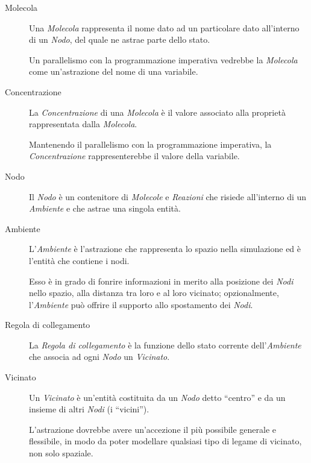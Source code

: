             \begin{description}
                \item[Molecola]\label{itm:mol}
                    Una \emph{Molecola} rappresenta il nome dato ad un particolare dato all'interno di un \emph{Nodo}, del quale ne astrae parte dello stato.

                    Un parallelismo con la programmazione imperativa vedrebbe la \emph{Molecola} come un'astrazione del nome di una variabile.

                \item[Concentrazione]\label{itm:conc}
                    La \emph{Concentrazione} di una \emph{Molecola} è il valore associato alla proprietà rappresentata dalla \emph{Molecola}.

                    Mantenendo il parallelismo con la programmazione imperativa, la \emph{Concentrazione} rappresenterebbe il valore della variabile.

                \item[Nodo]\label{itm:node}
                    Il \emph{Nodo} è un contenitore di \emph{Molecole} e \emph{Reazioni} che risiede all'interno di un \emph{Ambiente} e che astrae una singola entità.

                \item[Ambiente]\label{itm:env}
                    L'\emph{Ambiente} è l'astrazione che rappresenta lo spazio nella simulazione ed è l'entità che contiene i nodi.

                    Esso è in grado di fonrire informazioni in merito alla posizione dei \emph{Nodi} nello spazio, alla distanza tra loro e al loro vicinato; opzionalmente, l'\emph{Ambiente} può offrire il supporto allo spostamento dei \emph{Nodi}.

                \item[Regola di collegamento]\label{itm:linkr}
                    La \emph{Regola di collegamento} è la funzione dello stato corrente dell'\emph{Ambiente} che associa ad ogni \emph{Nodo} un \emph{Vicinato}.

                \item[Vicinato]\label{itm:neigh}
                    Un \emph{Vicinato} è un'entità costituita da un \emph{Nodo} detto ``centro'' e da un insieme di altri \emph{Nodi} (i ``vicini'').

                    L'astrazione dovrebbe avere un'accezione il più possibile generale e flessibile, in modo da poter modellare qualsiasi tipo di legame di vicinato, non solo spaziale.


\end{description}
